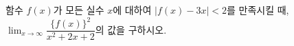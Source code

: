 함수 $f(x)$가 모든 실수 $x$에 대하여 $|f(x)-3x|<2$를 만족시킬 때, $\displaystyle\lim_{x\to\infty}\dfrac{\{f(x)\}^2}{x^2+2x+2}$의 값을 구하시오.
